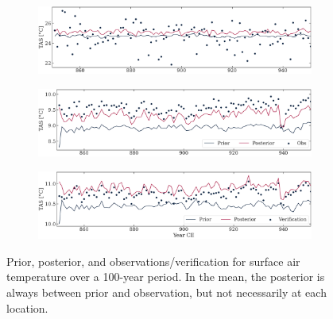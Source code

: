 \documentclass[parskip=half,DIV=16]{scrartcl}
\begin{document}
\begin{figure}[h]
    \centering

    \begin{subfigure}[c]{\textwidth}
        \includegraphics[width=\textwidth]{figures/plots/tas_obs_vs_reconstruction.pdf}
        \label{fig:tas-obs-reconstruction}
    \end{subfigure}
    
    \bigskip
    
    \begin{subfigure}[c]{\textwidth}
        \includegraphics[width=\textwidth]{figures/plots/tas_obs_vs_reconstruction_mean.pdf}
        \label{fig:tas-obs-reconstruction-mean}
     \end{subfigure}
    
    \bigskip
    
    \begin{subfigure}[c]{\textwidth}
        \includegraphics[width=\textwidth]{figures/plots/tas_obs_vs_reconstruction_mean_all.pdf}
        \label{fig:tas-obs-reconstruction-mean-all}
     \end{subfigure}

    \caption{Prior, posterior, and observations/verification for surface air temperature over a 100-year period. In the mean, the posterior is always between prior and observation, but not necessarily at each location.}
\end{figure}
\end{document}
